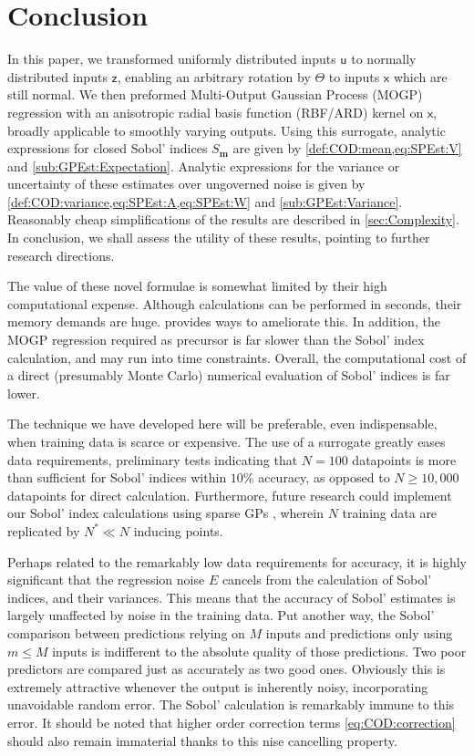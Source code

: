 \documentclass[preprint,12pt]{elsarticle}
\newcommand*{\mi}[1]{\mathbf{#1}}
\newcommand*{\rv}[1]{\mathsf{#1}}
\begin{document}
\section{Conclusion}\label{sec:Conc}
    In this paper, we transformed uniformly distributed inputs $\rv{u}$ to normally distributed inputs $\rv{z}$, enabling an arbitrary rotation by $\Theta$ to inputs $\rv{x}$ which are still normal. We then preformed Multi-Output Gaussian Process (MOGP) regression with an anisotropic radial basis function (RBF/ARD) kernel on $\rv{x}$, broadly applicable to smoothly varying outputs. Using this surrogate, analytic expressions for closed Sobol' indices $S_{\mi{m}}$ are given by \cref{def:COD:mean,eq:SPEst:V} and \cref{sub:GPEst:Expectation}. Analytic expressions for the variance or uncertainty of these estimates over ungoverned noise is given by \cref{def:COD:variance,eq:SPEst:A,eq:SPEst:W} and \cref{sub:GPEst:Variance}. Reasonably cheap simplifications of the results are described in \cref{sec:Complexity}.
    In conclusion, we shall assess the utility of these results, pointing to further research directions.

    The value of these novel formulae is somewhat limited by their high computational expense. Although calculations can be performed in seconds, their memory demands are huge.  provides ways to ameliorate this. In addition, the MOGP regression required as precursor is far slower than the Sobol' index calculation, and may run into time constraints. Overall, the computational cost of a direct (presumably Monte Carlo) numerical evaluation of Sobol' indices is far lower.

    The technique we have developed here will be preferable, even indispensable, when training data is scarce or expensive. The use of a surrogate greatly eases data requirements, preliminary tests indicating that $N=100$ datapoints is more than sufficient for Sobol' indices within $10\%$ accuracy, as opposed to $N\geq 10,000$ datapoints for direct calculation. Furthermore, future research could implement our Sobol' index calculations using sparse GPs \cite{Snelson.Ghahramani2006,titsias2009,Hensman2013}, wherein $N$ training data are replicated by $N^{*} \ll N$ inducing points.

    Perhaps related to the remarkably low data requirements for accuracy, it is highly significant that the regression noise $E$ cancels from the calculation of Sobol' indices, and their variances. This means that the accuracy of Sobol' estimates is largely unaffected by noise in the training data. Put another way, the Sobol' comparison between predictions relying on $M$ inputs and predictions only using $m \leq M$ inputs is indifferent to the absolute quality of those predictions. Two poor predictors are compared just as accurately as two good ones. Obviously this is extremely attractive whenever the output is inherently noisy, incorporating unavoidable random error. The Sobol' calculation is remarkably immune to this error. It should be noted that higher order correction terms \cref{eq:COD:correction} should also remain immaterial thanks to this nise cancelling property.
\end{document}
